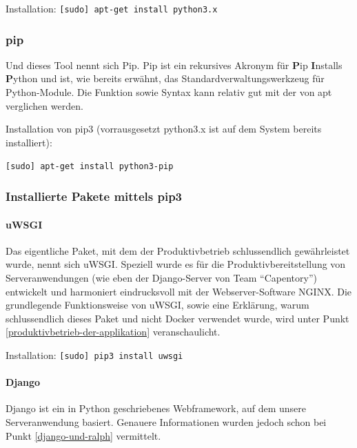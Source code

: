 Installation: \texttt{{[}sudo{]}\ apt-get\ install\ python3.x}

\hypertarget{pip}{%
\subsubsection{pip}\label{pip}}

Und dieses Tool nennt sich Pip. Pip ist ein rekursives Akronym für
\textbf{P}ip \textbf{I}nstalls \textbf{P}ython und ist, wie bereits
erwähnt, das Standardverwaltungswerkzeug für Python-Module. Die Funktion
sowie Syntax kann relativ gut mit der von apt verglichen werden.

Installation von pip3 (vorrausgesetzt python3.x ist auf dem System
bereits installiert):

\texttt{{[}sudo{]}\ apt-get\ install\ python3-pip}

\hypertarget{installierte-pakete-mittels-pip3}{%
\subsubsection{Installierte Pakete mittels
pip3}\label{installierte-pakete-mittels-pip3}}

\hypertarget{uwsgi}{%
\paragraph{uWSGI}\label{uwsgi}}

Das eigentliche Paket, mit dem der Produktivbetrieb schlussendlich
gewährleistet wurde, nennt sich uWSGI. Speziell wurde es für die
Produktivbereitstellung von Serveranwendungen (wie eben der
Django-Server von Team ``Capentory'') entwickelt und harmoniert
eindrucksvoll mit der Webserver-Software NGINX. Die grundlegende
Funktionsweise von uWSGI, sowie eine Erklärung, warum schlussendlich
dieses Paket und nicht Docker verwendet wurde, wird unter Punkt
\ref{produktivbetrieb-der-applikation} veranschaulicht.

Installation: \texttt{{[}sudo{]}\ pip3\ install\ uwsgi}

\hypertarget{django}{%
\paragraph{Django}\label{django}}

Django ist ein in Python geschriebenes Webframework, auf dem unsere
Serveranwendung basiert. Genauere Informationen wurden jedoch schon bei
Punkt \ref{django-und-ralph} vermittelt.

